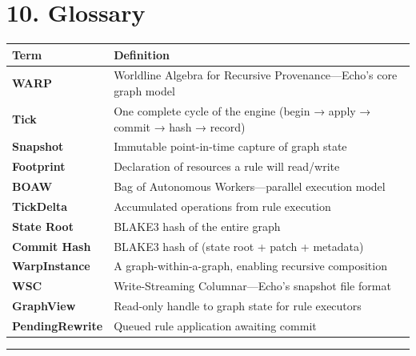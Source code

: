 \documentclass[
  11pt,
]{book}
\newcounter{none} %
\begin{document}
\section{10. Glossary}\label{glossary}

{\def\LTcaptype{none} %
\begin{longtable}[]{@{}
  >{\raggedright\arraybackslash}p{}
  >{\raggedright\arraybackslash}p{}@{}}
\toprule\noalign{}
\begin{minipage}[b]{\linewidth}\raggedright
Term
\end{minipage} & \begin{minipage}[b]{\linewidth}\raggedright
Definition
\end{minipage} \\
\midrule\noalign{}
\endhead
\bottomrule\noalign{}
\endlastfoot
\textbf{WARP} & Worldline Algebra for Recursive Provenance---Echo's core
graph model \\
\textbf{Tick} & One complete cycle of the engine (begin → apply → commit
→ hash → record) \\
\textbf{Snapshot} & Immutable point-in-time capture of graph state \\
\textbf{Footprint} & Declaration of resources a rule will read/write \\
\textbf{BOAW} & Bag of Autonomous Workers---parallel execution model \\
\textbf{TickDelta} & Accumulated operations from rule execution \\
\textbf{State Root} & BLAKE3 hash of the entire graph \\
\textbf{Commit Hash} & BLAKE3 hash of (state root + patch + metadata) \\
\textbf{WarpInstance} & A graph-within-a-graph, enabling recursive
composition \\
\textbf{WSC} & Write-Streaming Columnar---Echo's snapshot file format \\
\textbf{GraphView} & Read-only handle to graph state for rule
executors \\
\textbf{PendingRewrite} & Queued rule application awaiting commit \\
\end{longtable}
}

\begin{center}\rule{0.5\linewidth}{0.5pt}\end{center}
\end{document}

